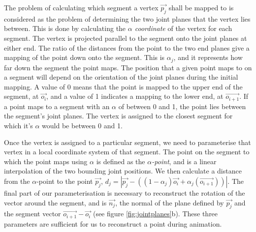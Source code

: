 \documentclass[10pt,oneside,fleqn,a4paper]{book}
\begin{document}
The problem of calculating which segment a vertex $\vec{p_j}$ shall be mapped to is considered as the problem of determining the two joint planes that the vertex lies between. This is done by calculating the {\it $\alpha$ coordinate} of the vertex for each segment. The vertex is projected parallel to the segment onto the joint planes at either end. The ratio of the distances from the point to the two end planes give a mapping of the point down onto the segment. This is $\alpha_{j}$, and it represents how far down the segment the point maps. The position that a given point maps to on a segment will depend on the orientation of the joint planes during the initial mapping. A value of 0 means that the point is mapped to the upper end of the segment, at $\vec{o_i}$, and a value of 1 indicates a mapping to the lower end, at $\vec{o_{i+1}}$. If a point maps to a segment with an $\alpha$ of between 0 and 1, the point lies between the segment's joint planes. The vertex is assigned to the closest segment for which it's $\alpha$ would be between 0 and 1.

Once the vertex is assigned to a particular segment, we need to parameterise that vertex in a local coordinate system of that segment. The point on the segment to which the point maps using $\alpha$ is defined as the {\it $\alpha$-point}, and is a linear interpolation of the two bounding joint positions. We then calculate a distance from the $\alpha$-point to the point $\vec{p_j}$, $d_j = |\vec{p_j} - ((1-\alpha_{j})\vec{o_i} + \alpha_{j}(\vec{o_{i+1}}))|$. The final part of our parameterisation is necessary to reconstruct the rotation of the vector around the segment, and is $\vec{n_j}$, the normal of the plane defined by $\vec{p_j}$ and the segment vector $\vec{o_{i+1}} - \vec{o_i}$ (see figure \ref{fig:jointplanes}b). These three parameters are sufficient for us to reconstruct a point during animation.
\end{document}
